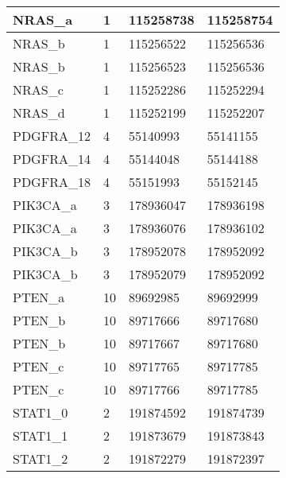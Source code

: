 \begin{longtable}{| p{} | C{.10\textwidth} | C{.35\textwidth} | C{.35\textwidth} |}
NRAS\_a                 & 1            & 115258738             & 115258754           \\ \hline
NRAS\_b                 & 1            & 115256522             & 115256536           \\ \hline
NRAS\_b                 & 1            & 115256523             & 115256536           \\ \hline
NRAS\_c                 & 1            & 115252286             & 115252294           \\ \hline
NRAS\_d                 & 1            & 115252199             & 115252207           \\ \hline
PDGFRA\_12              & 4            & 55140993              & 55141155            \\ \hline
PDGFRA\_14              & 4            & 55144048              & 55144188            \\ \hline
PDGFRA\_18              & 4            & 55151993              & 55152145            \\ \hline
PIK3CA\_a               & 3            & 178936047             & 178936198           \\ \hline
PIK3CA\_a               & 3            & 178936076             & 178936102           \\ \hline
PIK3CA\_b               & 3            & 178952078             & 178952092           \\ \hline
PIK3CA\_b               & 3            & 178952079             & 178952092           \\ \hline
PTEN\_a                 & 10           & 89692985              & 89692999            \\ \hline
PTEN\_b                 & 10           & 89717666              & 89717680            \\ \hline
PTEN\_b                 & 10           & 89717667              & 89717680            \\ \hline
PTEN\_c                 & 10           & 89717765              & 89717785            \\ \hline
PTEN\_c                 & 10           & 89717766              & 89717785            \\ \hline
STAT1\_0                & 2            & 191874592             & 191874739           \\ \hline
STAT1\_1                & 2            & 191873679             & 191873843           \\ \hline
STAT1\_2                & 2            & 191872279             & 191872397           \\ \hline

\end{longtable}
